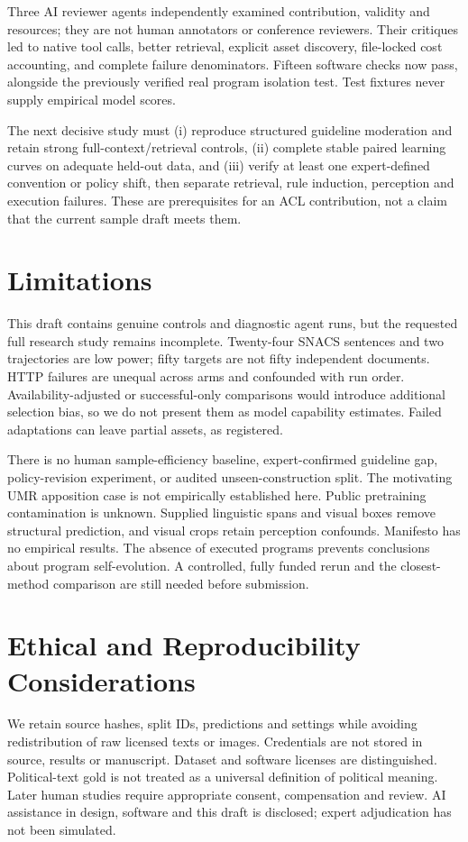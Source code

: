 \documentclass[11pt]{article}
\begin{document}
Three AI reviewer agents independently examined contribution, validity and resources; they are not human annotators or conference reviewers. Their critiques led to native tool calls, better retrieval, explicit asset discovery, file-locked cost accounting, and complete failure denominators. Fifteen software checks now pass, alongside the previously verified real program isolation test. Test fixtures never supply empirical model scores.

The next decisive study must (i) reproduce structured guideline moderation and retain strong full-context/retrieval controls, (ii) complete stable paired learning curves on adequate held-out data, and (iii) verify at least one expert-defined convention or policy shift, then separate retrieval, rule induction, perception and execution failures. These are prerequisites for an ACL contribution, not a claim that the current sample draft meets them.

\section{Limitations}
This draft contains genuine controls and diagnostic agent runs, but the requested full research study remains incomplete. Twenty-four SNACS sentences and two trajectories are low power; fifty targets are not fifty independent documents. HTTP failures are unequal across arms and confounded with run order. Availability-adjusted or successful-only comparisons would introduce additional selection bias, so we do not present them as model capability estimates. Failed adaptations can leave partial assets, as registered.

There is no human sample-efficiency baseline, expert-confirmed guideline gap, policy-revision experiment, or audited unseen-construction split. The motivating UMR apposition case is not empirically established here. Public pretraining contamination is unknown. Supplied linguistic spans and visual boxes remove structural prediction, and visual crops retain perception confounds. Manifesto has no empirical results. The absence of executed programs prevents conclusions about program self-evolution. A controlled, fully funded rerun and the closest-method comparison are still needed before submission.

\section*{Ethical and Reproducibility Considerations}
We retain source hashes, split IDs, predictions and settings while avoiding redistribution of raw licensed texts or images. Credentials are not stored in source, results or manuscript. Dataset and software licenses are distinguished. Political-text gold is not treated as a universal definition of political meaning. Later human studies require appropriate consent, compensation and review. AI assistance in design, software and this draft is disclosed; expert adjudication has not been simulated.


\end{document}
